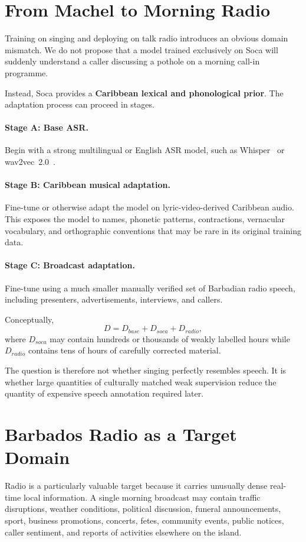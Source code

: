 \documentclass[10pt,twocolumn]{article}
\begin{document}
\section{From Machel to Morning Radio}
Training on singing and deploying on talk radio introduces an obvious domain mismatch. We do not propose that a model trained exclusively on Soca will suddenly understand a caller discussing a pothole on a morning call-in programme.

Instead, Soca provides a \textbf{Caribbean lexical and phonological prior}. The adaptation process can proceed in stages.

\paragraph{Stage A: Base ASR.} Begin with a strong multilingual or English ASR model, such as Whisper~\cite{radford2022whisper} or wav2vec~2.0~\cite{baevski2020wav2vec}.

\paragraph{Stage B: Caribbean musical adaptation.} Fine-tune or otherwise adapt the model on lyric-video-derived Caribbean audio. This exposes the model to names, phonetic patterns, contractions, vernacular vocabulary, and orthographic conventions that may be rare in its original training data.

\paragraph{Stage C: Broadcast adaptation.} Fine-tune using a much smaller manually verified set of Barbadian radio speech, including presenters, advertisements, interviews, and callers.

Conceptually,
\begin{equation}
D = D_{base} + D_{soca} + D_{radio},
\end{equation}
where $D_{soca}$ may contain hundreds or thousands of weakly labelled hours while $D_{radio}$ contains tens of hours of carefully corrected material.

The question is therefore not whether singing perfectly resembles speech. It is whether large quantities of culturally matched weak supervision reduce the quantity of expensive speech annotation required later.

\section{Barbados Radio as a Target Domain}
Radio is a particularly valuable target because it carries unusually dense real-time local information. A single morning broadcast may contain traffic disruptions, weather conditions, political discussion, funeral announcements, sport, business promotions, concerts, fetes, community events, public notices, caller sentiment, and reports of activities elsewhere on the island.
\end{document}
